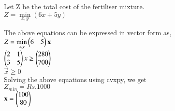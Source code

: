 \documentclass[journal,12pt,twocolumn]{IEEEtran}
\begin{document}
Let Z be the total cost of the fertiliser mixture.\\
\vspace{0.25cm}
\centering
$ Z = \min\limits_{x,y} (6x + 5y)$\\
\vspace{0.25cm}
\raggedright
The above equations can be expressed in vector form as,\\
\centering
\vspace{0.25cm}
$ Z = \min\limits_{x,y} \begin{pmatrix}6&5\end{pmatrix} \mathbf{x}$\\
\vspace{0.25cm}
$\begin{pmatrix}2&1\\3&5\end{pmatrix}x \geq \begin{pmatrix}280\\700\end{pmatrix}$\\
\vspace{0.25cm}
$ \vec{x} \geq 0 $\\
\vspace{0.25cm}
Solving the above equations using cvxpy, we get\\
\vspace{0.25cm}
$Z_{min} = Rs. 1000$\\
\vspace{0.25cm}
$\mathbf{x} = \begin{pmatrix}100\\80\end{pmatrix} $\\
\vspace{0.25cm}
\end{document}
